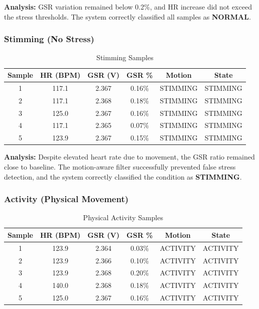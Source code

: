 \documentclass[a4paper,12pt]{report}
\begin{document}
\textbf{Analysis:} GSR variation remained below 0.2\%, and HR increase did not exceed the stress thresholds. The system correctly classified all samples as \textbf{NORMAL}.

\clearpage
\subsubsection{Stimming (No Stress)} \label{subsec:stimming_state}

\begin{table}[h]
\centering
\caption{Stimming Samples}
\renewcommand{\arraystretch}{1.2}
\begin{tabular}{|c|c|c|c|c|c|}
\hline
\textbf{Sample} & \textbf{HR (BPM)} & \textbf{GSR (V)} & \textbf{GSR \%} & \textbf{Motion} & \textbf{State} \\
\hline
1 & 117.1 & 2.367 & 0.16\% & STIMMING & STIMMING \\
2 & 117.1 & 2.368 & 0.18\% & STIMMING & STIMMING \\
3 & 125.0 & 2.367 & 0.16\% & STIMMING & STIMMING \\
4 & 117.1 & 2.365 & 0.07\% & STIMMING & STIMMING \\
5 & 123.9 & 2.367 & 0.15\% & STIMMING & STIMMING \\
\hline
\end{tabular}
\label{tab:stimming_samples}
\end{table}

\textbf{Analysis:} Despite elevated heart rate due to movement, the GSR ratio remained close to baseline. The motion-aware filter successfully prevented false stress detection, and the system correctly classified the condition as \textbf{STIMMING}.

\subsubsection{Activity (Physical Movement)} \label{subsec:activity_state}

\begin{table}[h]
\centering
\caption{Physical Activity Samples}
\renewcommand{\arraystretch}{1.2}
\begin{tabular}{|c|c|c|c|c|c|}
\hline
\textbf{Sample} & \textbf{HR (BPM)} & \textbf{GSR (V)} & \textbf{GSR \%} & \textbf{Motion} & \textbf{State} \\
\hline
1 & 123.9 & 2.364 & 0.03\% & ACTIVITY & ACTIVITY \\
2 & 123.9 & 2.366 & 0.10\% & ACTIVITY & ACTIVITY \\
3 & 123.9 & 2.368 & 0.20\% & ACTIVITY & ACTIVITY \\
4 & 140.0 & 2.368 & 0.18\% & ACTIVITY & ACTIVITY \\
5 & 125.0 & 2.367 & 0.16\% & ACTIVITY & ACTIVITY \\
\hline
\end{tabular}
\label{tab:activity_samples}
\end{table}
\end{document}
